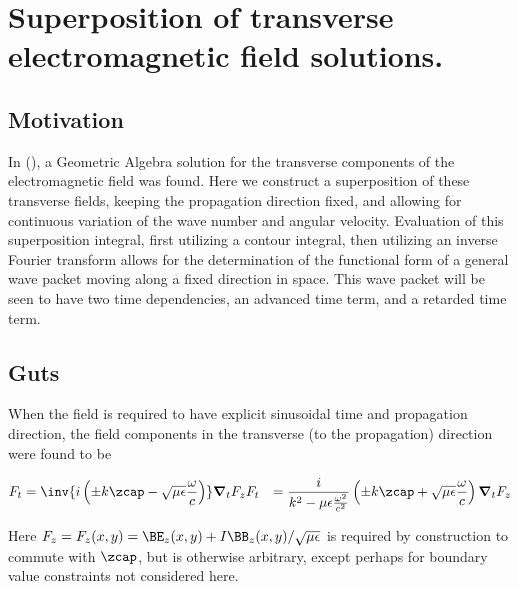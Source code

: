 

\chapter{Superposition of transverse electromagnetic field solutions.}
\label{chap:waveguideRetardedAdvanced}
{}
\date{August 1, 2009}

\beginArtWithToc

\section{Motivation}

In (\cite{transverseField}), a Geometric Algebra solution for the transverse components of the electromagnetic field was found.  Here we construct a superposition of these transverse fields, keeping the propagation direction fixed, and allowing for continuous variation of the wave number and angular velocity.  Evaluation of this superposition integral, first utilizing a contour integral, then utilizing an inverse Fourier transform allows for the determination of the functional form of a general wave packet moving along a fixed direction in space.  This wave packet will be seen to have two time dependencies, an advanced time term, and a retarded time term.

\section{Guts}

When the field is required to have explicit sinusoidal time and propagation direction, the field components in the transverse (to the propagation) direction were found to be

\begin{align}\label{eqn:waveguideRetardedAdvanced:foo7}
F_t &= \inv{i \left( \pm k \zcap - \sqrt{\mu\epsilon}\frac{\omega}{c}\right) } \spacegrad_t F_z 
F_t &= \frac{i}{k^2 - \mu\epsilon\frac{\omega^2}{c^2}} \left( \pm k \zcap + \sqrt{\mu\epsilon}\frac{\omega}{c}\right) \spacegrad_t F_z
\end{align}

Here $F_z = F_z(x,y) = \BE_z(x,y) + I\BB_z(x,y)/\sqrt{\mu\epsilon}$ is required by construction to commute with $\zcap$, but is otherwise arbitrary, except perhaps for boundary value constraints not considered here.

